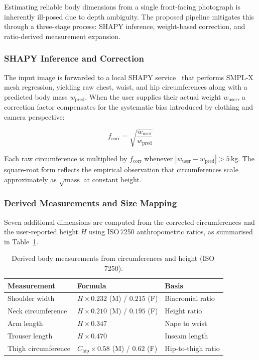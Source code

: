 Estimating reliable body dimensions from a single front-facing photograph is inherently ill-posed due to depth ambiguity. The proposed pipeline mitigates this through a three-stage process: SHAPY inference, weight-based correction, and ratio-derived measurement expansion.

\subsubsection{SHAPY Inference and Correction}

The input image is forwarded to a local SHAPY service~\cite{choutas2022shapy} that performs SMPL-X mesh regression, yielding raw chest, waist, and hip circumferences along with a predicted body mass $w_{\text{pred}}$. When the user supplies their actual weight $w_{\text{user}}$, a correction factor compensates for the systematic bias introduced by clothing and camera perspective:

\begin{equation}
    f_{\text{corr}} = \sqrt{\frac{w_{\text{user}}}{w_{\text{pred}}}}
    \label{eq:correction}
\end{equation}

Each raw circumference is multiplied by $f_{\text{corr}}$ whenever $|w_{\text{user}} - w_{\text{pred}}| > 5$\,kg. The square-root form reflects the empirical observation that circumferences scale approximately as $\sqrt{\text{mass}}$ at constant height.

\subsubsection{Derived Measurements and Size Mapping}

Seven additional dimensions are computed from the corrected circumferences and the user-reported height $H$ using ISO\,7250 anthropometric ratios, as summarised in Table~\ref{tab:ratios}.

\begin{table}[H]
\caption{Derived body measurements from circumferences and height (ISO\,7250).}
\label{tab:ratios}
\centering
\begin{tabular}{l l l}
\toprule
\textbf{Measurement} & \textbf{Formula} & \textbf{Basis} \\
\midrule
Shoulder width & $H \times 0.232$ (M) / $0.215$ (F) & Biacromial ratio \\
Neck circumference & $H \times 0.210$ (M) / $0.195$ (F) & Height ratio \\
Arm length & $H \times 0.347$ & Nape to wrist \\
Trouser length & $H \times 0.470$ & Inseam length \\
Thigh circumference & $C_{\text{hip}} \times 0.58$ (M) / $0.62$ (F) & Hip-to-thigh ratio \\
\bottomrule
\end{tabular}
\end{table}

